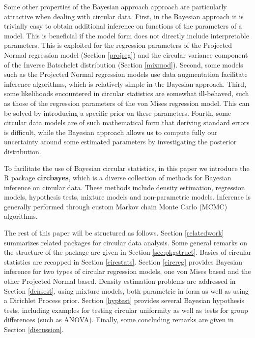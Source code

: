 \documentclass{article}
\let\proglang=\textsf
\newcommand{\pkg}[1]{\textbf{#1}}
\begin{document}
Some other properties of the Bayesian approach approach are particularly
attractive when dealing with circular data. First, in the Bayesian
approach it is trivially easy to obtain additional inference on
functions of the parameters of a model. This is beneficial if the model
form does not directly include interpretable parameters. This is
exploited for the regression parameters of the Projected Normal
regression model (Section \ref{projreg}) and the circular variance
component of the Inverse Batschelet distribution (Section \ref{mixmod}).
Second, some models such as the Projected Normal regression models use
data augmentation facilitate inference algorithms, which is relatively
simple in the Bayesian approach. Third, some likelihoods encountered in
circular statistics are somewhat ill-behaved, such as those of the
regression parameters of the von Mises regression model. This can be
solved by introducing a specific prior on these parameters. Fourth, some
circular data models are of such mathematical form that deriving
standard errors is difficult, while the Bayesian approach allows us to
compute fully our uncertainty around some estimated parameters by
investigating the posterior distribution.

To facilitate the use of Bayesian circular statistics, in this paper we
introduce the \proglang{R} package \pkg{circbayes}, which is a diverse
collection of methods for Bayesian inference on circular data. These
methods include density estimation, regression models, hypothesis tests,
mixture models and non-parametric models. Inference is generally
performed through custom Markov chain Monte Carlo (MCMC) algorithms.

The rest of this paper will be structured as follows. Section
\ref{relatedwork} summarizes related packages for circular data
analysis. Some general remarks on the structure of the package are given
in Section \ref{sec:pkgstruct}. Basics of circular statistics are
recapped in Section \ref{circstats}. Section \ref{circreg} provides
Bayesian inference for two types of circular regression models, one von
Mises based and the other Projected Normal based. Density estimation
problems are addressed in Section \ref{densest}, using mixture models,
both parametric in form as well as using a Dirichlet Process prior.
Section \ref{hyptest} provides several Bayesian hypothesis tests,
including examples for testing circular uniformity as well as tests for
group differences (such as ANOVA). Finally, some concluding remarks are
given in Section \ref{discussion}.
\end{document}
